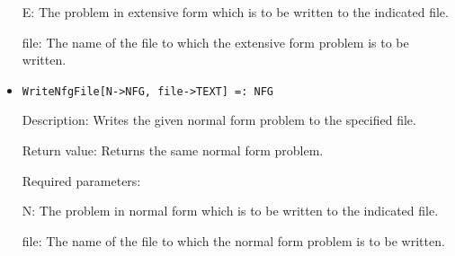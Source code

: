 \begin{itemize}
\bd
\item
[E:] The problem in extensive form which is to be written to the
indicated file.
\item
[file:] The name of the file to which the extensive form problem is to
be written.
\ed
\ed

\item

\protect \large \begin{verbatim}
WriteNfgFile[N->NFG, file->TEXT] =: NFG
\end{verbatim}\normalsize

\bd
\item
[Description:] Writes the given normal form problem to the specified
file.
\item
[Return value:] Returns the same normal form problem.
\item
[Required parameters:]\hfil\null

\bd
\item
[N:] The problem in normal form which is to be written to the
indicated file.

\item
[file:] The name of the file to which the normal form problem is
to be written.
\ed
\ed




\end{itemize}










 




















